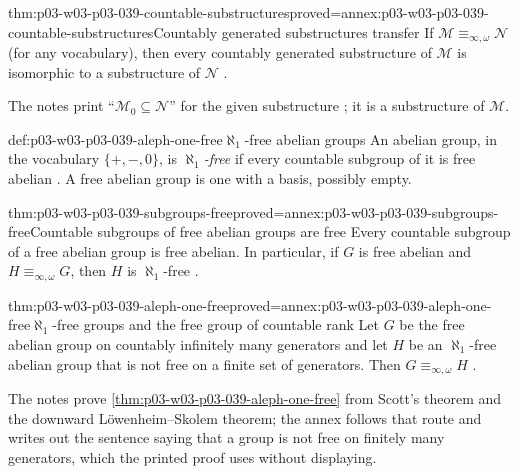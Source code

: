 \begin{hblemma}{thm:p03-w03-p03-039-countable-substructures}{proved=annex:p03-w03-p03-039-countable-substructures}{Countably generated substructures transfer}
If \(\mathcal M\equiv_{\infty,\omega}\mathcal N\) (for any vocabulary), then
every countably generated substructure of \(\mathcal M\) is isomorphic to a
substructure of \(\mathcal N\)
\cite[Ex.~2.5, p.~14]{Marker2014InfinitaryNotes}.
\end{hblemma}

The notes print ``\(\mathcal M_0\subseteq\mathcal N\)'' for the given
substructure \cite[Ex.~2.5, p.~14]{Marker2014InfinitaryNotes}; it is a
substructure of \(\mathcal M\).

\begin{hbdefinition}{def:p03-w03-p03-039-aleph-one-free}{\(\aleph_1\)-free abelian groups}
An abelian group, in the vocabulary \(\{+,-,0\}\), is \emph{\(\aleph_1\)-free}
if every countable subgroup of it is free abelian
\cite[Ex.~2.6, p.~14]{Marker2014InfinitaryNotes}. A free abelian group is
one with a basis, possibly empty.
\end{hbdefinition}

\begin{hblemma}{thm:p03-w03-p03-039-subgroups-free}{proved=annex:p03-w03-p03-039-subgroups-free}{Countable subgroups of free abelian groups are free}
Every countable subgroup of a free abelian group is free abelian. In
particular, if \(G\) is free abelian and \(H\equiv_{\infty,\omega}G\), then
\(H\) is \(\aleph_1\)-free
\cite[Ex.~2.6, p.~14]{Marker2014InfinitaryNotes}.
\end{hblemma}

\begin{hbcorollary}{thm:p03-w03-p03-039-aleph-one-free}{proved=annex:p03-w03-p03-039-aleph-one-free}{\(\aleph_1\)-free groups and the free group of countable rank}
Let \(G\) be the free abelian group on countably infinitely many generators
and let \(H\) be an \(\aleph_1\)-free abelian group that is not free on a
finite set of generators. Then \(G\equiv_{\infty,\omega}H\)
\cite[Cor.~2.23, p.~20]{Marker2014InfinitaryNotes}.
\end{hbcorollary}

The notes prove \cref{thm:p03-w03-p03-039-aleph-one-free} from Scott's
theorem and the downward L\"owenheim--Skolem theorem; the annex follows that
route and writes out the sentence saying that a group is not free on finitely
many generators, which the printed proof uses without displaying.

